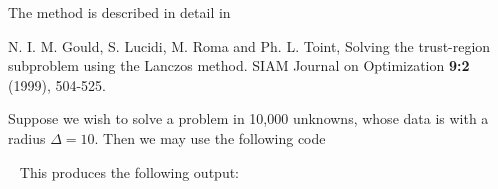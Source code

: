 \documentclass{galahad}
\begin{document}
\galreference
The method is described in detail in
\vspace*{1mm}

\noindent
N. I. M. Gould, S. Lucidi, M. Roma and Ph. L. Toint,
Solving the trust-region subproblem using the Lanczos method.
SIAM Journal on Optimization {\bf 9:2 } (1999), 504-525.


\galexample
Suppose we wish to solve a problem in 10,000 unknowns, whose data is
with a radius $\Delta = 10$. Then we may use the following code

{\tt \small
\VerbatimInput{\packageexample}
}
\noindent
This produces the following output:
{\tt \small
\VerbatimInput{\packageresults}
}
\end{document}
